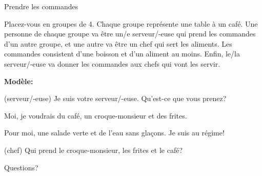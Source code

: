 \documentclass{beamer}
\begin{document}
  \begin{frame}{Prendre les commandes}

    {\small Placez-vous en groupes de 4.
    Chaque groupe représente une table à un café.
    Une personne de chaque groupe va être un/e serveur/-euse qui prend les commandes d'un autre groupe, et une autre va être un chef qui sert les aliments.
    Les commandes consistent d'une \alert{boisson} et d'un \alert{aliment} au moins.
    Enfin, le/la serveur/-euse va donner les commandes aux chefs qui vont les servir.} \\

    \begin{description}
      \small
      \item[] \textbf{Modèle:}
      \item[E1:] (serveur/-euse) Je suis votre serveur/-euse. Qu'est-ce que vous prenez?
      \item[E2:] Moi, je voudrais du café, un croque-monsieur et des frites.
      \item[E3:] Pour moi, une salade verte et de l'eau sans glaçons. Je suis au régime!
      \item[E4:] (chef) Qui prend le croque-monsieur, les frites et le café?
    \end{description}
  \end{frame}

  \begin{frame}{}
    \begin{center}
      \Large Questions?
    \end{center}
  \end{frame}
\end{document}
